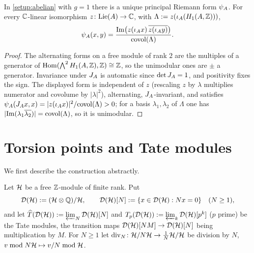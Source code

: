 \begin{lemma}\label{lem:elliptic-riemann-form}
In \cref{setup:abelian} with $g = 1$ there is a unique principal Riemann
form $\psi_{A}$. For every $\mathbb{C}$-linear isomorphism
$z \colon \mathrm{Lie}(A) \to \mathbb{C}$, with $\Lambda := z(\iota_{A}(H_{1}(A,\mathbb{Z})))$,
\[
  \psi_{A}(x, y) = \frac{\mathrm{Im}\bigl(z(\iota_{A}x)\,
  \overline{z(\iota_{A}y)}\bigr)}{\mathrm{covol}(\Lambda)} .
\]
\end{lemma}

\begin{proof}
The alternating forms on a free module of rank $2$ are the multiples of a
generator of $\operatorname{Hom}(\textstyle\bigwedge^{2}H_{1}(A,\mathbb{Z}), \mathbb{Z}) \cong \mathbb{Z}$, so
the unimodular ones are $\pm$ a generator. Invariance under
$J_{A}$ is automatic since $\det J_{A} = 1$, and
positivity fixes the sign. The displayed form is independent of $z$
(rescaling $z$ by $\lambda$ multiplies numerator and covolume by
$|\lambda|^{2}$), alternating, $J_{A}$-invariant, and
satisfies $\psi_{A}(J_{A}x, x) =
|z(\iota_{A}x)|^{2}/\mathrm{covol}(\Lambda) > 0$; for a basis
$\lambda_1, \lambda_2$ of $\Lambda$ one has
$|\mathrm{Im}(\lambda_1\overline{\lambda_2})| = \mathrm{covol}(\Lambda)$, so it is
unimodular.
\end{proof}

\section{Torsion points and Tate modules}

We first describe the construction abstractly.

\begin{setup}\label{setup:free-module}
Let $\mathcal{H}$ be a free $\mathbb{Z}$-module of finite rank. Put
\[
  \mathcal{D}(\mathcal{H}) := (\mathcal{H}\otimes\mathbb{Q})/\mathcal{H},
  \qquad
  \mathcal{D}(\mathcal{H})[N] := \{x \in \mathcal{D}(\mathcal{H}) : Nx = 0\}
  \quad (N \geq 1),
\]
and let $\widehat{T}(\mathcal{D}(\mathcal{H})) := \varprojlim_N \mathcal{D}(\mathcal{H})[N]$
and $T_{p}(\mathcal{D}(\mathcal{H})) := \varprojlim_k \mathcal{D}(\mathcal{H})[p^{k}]$
($p$ prime) be the Tate modules, the transition maps
$\mathcal{D}(\mathcal{H})[NM] \to \mathcal{D}(\mathcal{H})[N]$ being
multiplication by $M$. For $N \geq 1$ let
$\mathrm{div}_{N} \colon \mathcal{H}/N\mathcal{H} \to
\tfrac{1}{N}\mathcal{H}/\mathcal{H}$ be division by $N$,
$v \bmod N\mathcal{H} \mapsto v/N \bmod \mathcal{H}$.
\end{setup}

